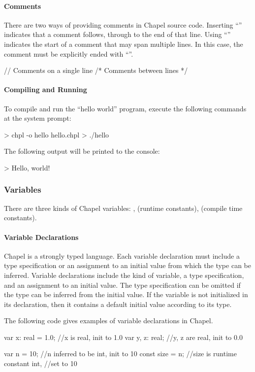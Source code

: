 \paragraph{Comments} 
There are two ways of providing comments in Chapel source code.
Inserting ``\chpl{//}'' indicates that a comment follows, through to  
the end of that line.  Using ``\chpl{/*}'' indicates the start of a comment that
may span multiple lines.  In this case, the comment must be
explicitly ended with ``\chpl{*/}''.
\begin{chapel}
// Comments on a single line
/* Comments
   between lines */
\end{chapel}

\paragraph{Compiling and Running} 
To compile and run the ``hello world'' program, execute the 
following commands at the system prompt:
\begin{commandline} 
> chpl -o hello hello.chpl
> ./hello
\end{commandline}
The following output will be printed to the console:
\begin{commandline}
> Hello, world!
\end{commandline}

\subsubsection{Variables}
There are three kinds of Chapel variables: ,
 (runtime constants),  (compile time constants).

\paragraph{Variable Declarations}
Chapel is a strongly typed language.  Each variable declaration
must include a type specification or an assignment to an initial value 
from which the type can be inferred.  
Variable declarations include the kind of variable, a type specification,
and an assignment to an initial value.  The type specification can be
omitted if the type can be inferred from the initial value.  If the
variable is not initialized in its declaration, then it contains a
default initial value according to its type.

\begin{example}
The following code gives examples of variable declarations in Chapel.
\begin{chapel}
var x: real = 1.0; //x is real, init to 1.0
var y, z: real; //y, z are real, init to 0.0

var n = 10; //n inferred to be int, init to 10
const size = n; //size is runtime constant int,
                //set to 10
\end{chapel}
\end{example}

